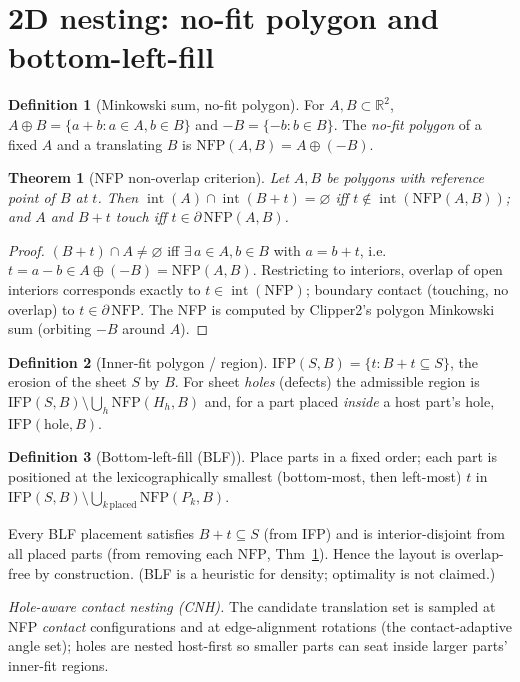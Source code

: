 \documentclass[11pt]{article}
\theoremstyle{definition}\newtheorem{definition}{Definition}[section]
\theoremstyle{plain}\newtheorem{theorem}{Theorem}[section]
\newcommand{\R}{\mathbb{R}}\newcommand{\Z}{\mathbb{Z}}\newcommand{\Norm}[1]{\lVert #1\rVert}
\begin{document}
\section{2D nesting: no-fit polygon and bottom-left-fill}
\begin{definition}[Minkowski sum, no-fit polygon]
For $A,B\subset\R^2$, $A\oplus B=\{a+b:a\in A,b\in B\}$ and $-B=\{-b:b\in B\}$. The \emph{no-fit polygon}
of a fixed $A$ and a translating $B$ is $\mathrm{NFP}(A,B)=A\oplus(-B)$.
\end{definition}
\begin{theorem}[NFP non-overlap criterion]\label{thm:nfp}
Let $A,B$ be polygons with reference point of $B$ at $t$. Then $\operatorname{int}(A)\cap\operatorname{int}(B+t)=\varnothing$
iff $t\notin\operatorname{int}(\mathrm{NFP}(A,B))$; and $A$ and $B+t$ touch iff $t\in\partial\,\mathrm{NFP}(A,B)$.
\end{theorem}
\begin{proof}
$(B+t)\cap A\neq\varnothing$ iff $\exists\,a\in A,b\in B$ with $a=b+t$, i.e.\ $t=a-b\in A\oplus(-B)=\mathrm{NFP}(A,B)$.
Restricting to interiors, overlap of open interiors corresponds exactly to $t\in\operatorname{int}(\mathrm{NFP})$;
boundary contact (touching, no overlap) to $t\in\partial\,\mathrm{NFP}$. The NFP is computed by Clipper2's
polygon Minkowski sum (orbiting $-B$ around $A$).
\end{proof}
\begin{definition}[Inner-fit polygon / region]
$\mathrm{IFP}(S,B)=\{t:B+t\subseteq S\}$, the erosion of the sheet $S$ by $B$. For sheet \emph{holes} (defects)
the admissible region is $\mathrm{IFP}(S,B)\setminus\bigcup_h \mathrm{NFP}(H_h,B)$ and, for a part placed
\emph{inside} a host part's hole, $\mathrm{IFP}(\text{hole},B)$.
\end{definition}
\begin{definition}[Bottom-left-fill (BLF)]
Place parts in a fixed order; each part is positioned at the lexicographically smallest (bottom-most, then
left-most) $t$ in $\mathrm{IFP}(S,B)\setminus\bigcup_{k\,\text{placed}}\mathrm{NFP}(P_k,B)$.
\end{definition}
\begin{proposition}
Every BLF placement satisfies $B+t\subseteq S$ (from IFP) and is interior-disjoint from all placed parts
(from removing each $\mathrm{NFP}$, Thm~\ref{thm:nfp}). Hence the layout is overlap-free by construction. (BLF
is a heuristic for density; optimality is not claimed.)
\end{proposition}
\noindent\emph{Hole-aware contact nesting (CNH).} The candidate translation set is sampled at NFP
\emph{contact} configurations and at edge-alignment rotations (the contact-adaptive angle set); holes are
nested host-first so smaller parts can seat inside larger parts' inner-fit regions.
\end{document}
